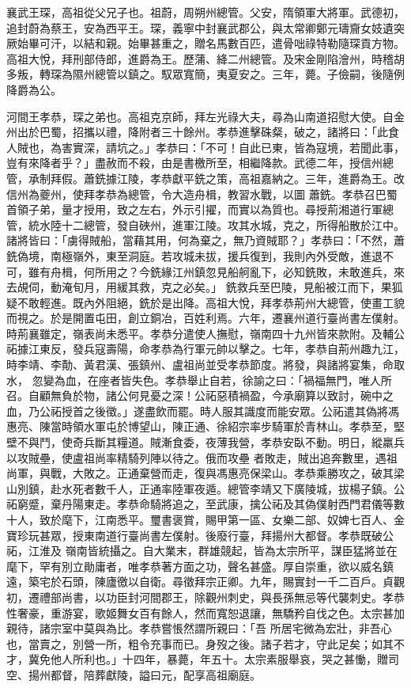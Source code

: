 \begin{pinyinscope}
 襄武王琛，高祖從父兄子也。祖蔚，周朔州總管。父安，隋領軍大將軍。武德初，追封蔚為蔡王，安為西平王。琛，義寧中封襄武郡公，與太常卿鄭元璹齎女妓遺突厥始畢可汗，以結和親。始畢甚重之，贈名馬數百匹，遣骨咄祿特勒隨琛貢方物。高祖大悅，拜刑部侍郎，進爵為王。歷蒲、絳二州總管。及宋金剛陷澮州，時稽胡多叛，轉琛為隰州總管以鎮之。馭眾寬簡，夷夏安之。三年，薨。子儉嗣，後隨例降爵為公。



 河間王孝恭，琛之弟也。高祖克京師，拜左光祿大夫，尋為山南道招慰大使。自金州出於巴蜀，招攜以禮，降附者三十餘州。孝恭進擊硃粲，破之，諸將曰：「此食人賊也，為害實深，請坑之。」孝恭曰：「不可！自此已東，皆為寇境，若聞此事，豈有來降者乎？」盡赦而不殺，由是書檄所至，相繼降款。武德二年，授信州總管，承制拜假。蕭銑據江陵，孝恭獻平銑之策，高祖嘉納之。三年，進爵為王。改信州為夔州，使拜孝恭為總管，令大造舟楫，教習水戰，以圖
 蕭銑。孝恭召巴蜀首領子弟，量才授用，致之左右，外示引擢，而實以為質也。尋授荊湘道行軍總管，統水陸十二總管，發自硤州，進軍江陵。攻其水城，克之，所得船散於江中。諸將皆曰：「虜得賊船，當藉其用，何為棄之，無乃資賊耶？」孝恭曰：「不然，蕭銑偽境，南極嶺外，東至洞庭。若攻城未拔，援兵復到，我則內外受敵，進退不可，雖有舟楫，何所用之？今銑緣江州鎮忽見船舸亂下，必知銑敗，未敢進兵，來去覘伺，動淹旬月，用緩其救，克之必矣。」
 銑救兵至巴陵，見船被江而下，果狐疑不敢輕進。既內外阻絕，銑於是出降。高祖大悅，拜孝恭荊州大總管，使畫工貌而視之。於是開置屯田，創立銅冶，百姓利焉。六年，遷襄州道行臺尚書左僕射。時荊襄雖定，嶺表尚未悉平。孝恭分遣使人撫慰，嶺南四十九州皆來款附。及輔公祏據江東反，發兵寇壽陽，命孝恭為行軍元帥以擊之。七年，孝恭自荊州趣九江，時李靖、李勣、黃君漢、張鎮州、盧祖尚並受孝恭節度。將發，與諸將宴集，命取水，
 忽變為血，在座者皆失色。孝恭舉止自若，徐諭之曰：「禍福無門，唯人所召。自顧無負於物，諸公何見憂之深！公祏惡積禍盈，今承廟算以致討，碗中之血，乃公祏授首之後徵。」遂盡飲而罷。時人服其識度而能安眾。公祏遣其偽將馮惠亮、陳當時領水軍屯於博望山，陳正通、徐紹宗率步騎軍於青林山。孝恭至，堅壁不與鬥，使奇兵斷其糧道。賊漸食委，夜薄我營，孝恭安臥不動。明日，縱羸兵以攻賊壘，使盧祖尚率精騎列陣以待之。俄而攻壘
 者敗走，賊出追奔數里，遇祖尚軍，與戰，大敗之。正通棄營而走，復與馮惠亮保梁山。孝恭乘勝攻之，破其梁山別鎮，赴水死者數千人，正通率陸軍夜遁。總管李靖又下廣陵城，拔楊子鎮。公祏窮蹙，棄丹陽東走。孝恭命騎將追之，至武康，擒公祏及其偽僕射西門君儀等數十人，致於麾下，江南悉平。璽書褒賞，賜甲第一區、女樂二部、奴婢七百人、金寶珍玩甚眾，授東南道行臺尚書左僕射。後廢行臺，拜揚州大都督。孝恭既破公祏，江淮及
 嶺南皆統攝之。自大業末，群雄競起，皆為太宗所平，謀臣猛將並在麾下，罕有別立勛庸者，唯孝恭著方面之功，聲名甚盛。厚自崇重，欲以威名鎮遠，築宅於石頭，陳廬徼以自衛。尋徵拜宗正卿。九年，賜實封一千二百戶。貞觀初，遷禮部尚書，以功臣封河間郡王，除觀州刺史，與長孫無忌等代襲刺史。孝恭性奢豪，重游宴，歌姬舞女百有餘人，然而寬恕退讓，無驕矜自伐之色。太宗甚加親待，諸宗室中莫與為比。孝恭嘗悵然謂所親曰：「吾
 所居宅微為宏壯，非吾心也，當賣之，別營一所，粗令充事而已。身歿之後。諸子若才，守此足矣；如其不才，冀免他人所利也。」十四年，暴薨，年五十。太宗素服舉哀，哭之甚慟，贈司空、揚州都督，陪葬獻陵，謚曰元，配享高祖廟庭。




\end{pinyinscope}

